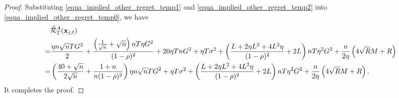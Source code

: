 \documentclass{article}
\begin{document}
\begin{proof}
Substituting \eqref{equa_implied_other_regret_temp1} and \eqref{equa_implied_other_regret_temp2} into \eqref{equa_implied_other_regret_temp0}, we have
\begin{align}
\nonumber
& \widehat{{\mathcal{R}}}_T^{A}({\bf x}_{j,t}) \\ \nonumber
= & \frac{\eta n\sqrt{n} T G^2}{2} + \frac{\left( \frac{1}{\sqrt{n}}+\sqrt{n} \right)nT\eta G^2}{(1-\rho)^2} + 20\eta T n G^2 +  \eta T\sigma^2 + \left( \frac{L + 2\eta L^2  + 4L^2 \eta}{(1-\rho)^2} +2L \right)  nT\eta^2 G^2    + \frac{n}{2\eta}\left(  4\sqrt{R}M + R   \right) \\ \nonumber
= & \left( \frac{40+\sqrt{n}}{2\sqrt{n}} + \frac{1+n}{n(1-\rho)^2} \right)\eta n\sqrt{n} T G^2 +\eta T\sigma^2 + \left( \frac{L + 2\eta L^2  + 4L^2 \eta}{(1-\rho)^2} +2L \right)  nT\eta^2 G^2    + \frac{n}{2\eta}\left(  4\sqrt{R}M + R   \right).
\end{align} It completes the proof.


\end{proof}
\end{document}

